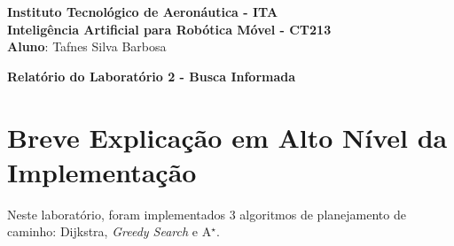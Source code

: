 \documentclass[brazil, 12pt]{article}
\begin{document}
\begin{center}
\textbf{Instituto Tecnológico de Aeronáutica - ITA} \\
\textbf{Inteligência Artificial para Robótica Móvel - CT213} \\
\textbf{Aluno}: Tafnes Silva Barbosa     %
\end{center}

\begin{center}
\textbf{Relatório do Laboratório 2 - Busca Informada}
\end{center}
\vspace*{0.5cm}

\section{Breve Explicação em Alto Nível da Implementação}
Neste laboratório, foram implementados 3 algoritmos de planejamento de caminho: Dijkstra, \textit{Greedy Search} e A$^{\star}$.
\end{document}
